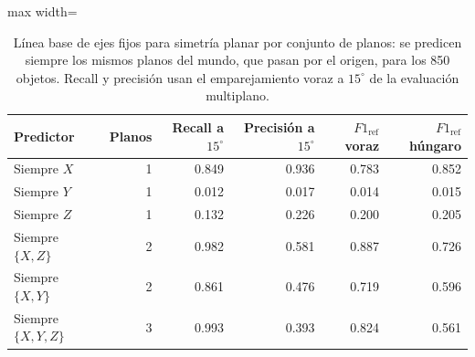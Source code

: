\begin{table}[htbp]
\centering
\caption{Línea base de ejes fijos para simetría planar por conjunto de planos: se predicen siempre los mismos planos del mundo, que pasan por el origen, para los 850 objetos. Recall y precisión usan el emparejamiento voraz a $15^\circ$ de la evaluación multiplano.}
\label{tab:base_plane_fijos_multi}
\begin{adjustbox}{max width=\textwidth}
\begin{tabular}{lrrrrr}
\toprule
Predictor & Planos & Recall a $15^\circ$ & Precisión a $15^\circ$ & $F1_{\mathrm{ref}}$ voraz & $F1_{\mathrm{ref}}$ húngaro \\
\midrule
Siempre $X$ & 1 & 0.849 & 0.936 & 0.783 & 0.852 \\
Siempre $Y$ & 1 & 0.012 & 0.017 & 0.014 & 0.015 \\
Siempre $Z$ & 1 & 0.132 & 0.226 & 0.200 & 0.205 \\
Siempre $\{X,Z\}$ & 2 & 0.982 & 0.581 & 0.887 & 0.726 \\
Siempre $\{X,Y\}$ & 2 & 0.861 & 0.476 & 0.719 & 0.596 \\
Siempre $\{X,Y,Z\}$ & 3 & 0.993 & 0.393 & 0.824 & 0.561 \\
\bottomrule
\end{tabular}
\end{adjustbox}
\end{table}
